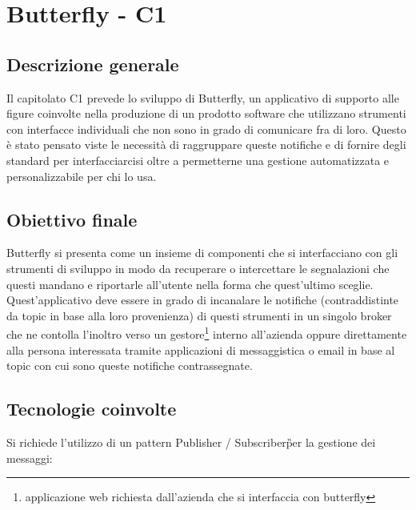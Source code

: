 \section{Butterfly - C1} \label{c1}
    \subsection{Descrizione generale}
	Il capitolato C1 prevede lo sviluppo di Butterfly, un applicativo di supporto alle figure coinvolte nella produzione di un prodotto software che utilizzano strumenti con interfacce individuali che non sono in grado di comunicare fra di loro.
	Questo  è stato pensato viste le necessità di raggruppare queste notifiche e di fornire degli standard per interfacciarcisi oltre a permetterne una gestione automatizzata e personalizzabile per chi lo usa.

    \subsection{Obiettivo finale}
    Butterfly si presenta come un insieme di componenti che si interfacciano con gli strumenti di sviluppo in modo da recuperare o intercettare le segnalazioni che questi mandano e riportarle all'utente nella forma che quest'ultimo sceglie.\\
    Quest'applicativo deve essere in grado di incanalare le notifiche (contraddistinte da topic in base alla loro provenienza) di questi strumenti in un singolo broker che ne contolla l'inoltro verso un gestore\footnote{applicazione web richiesta dall'azienda che si interfaccia con butterfly} interno all'azienda oppure direttamente alla persona interessata tramite applicazioni di messaggistica o email in base al topic con cui sono queste notifiche contrassegnate.

    \subsection{Tecnologie coinvolte}
	Si richiede l'utilizzo di un pattern Publisher / Subscriber\G per la gestione dei messaggi:

